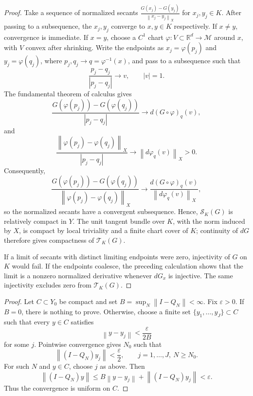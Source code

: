 \documentclass[11pt,oneside]{amsart}
\theoremstyle{plain}
\newtheorem{lemma}[theorem]{Lemma}
\theoremstyle{definition}
\theoremstyle{remark}
\newcommand{\RR}{\mathbb{R}}
\newcommand{\norm}[1]{\left\lVert #1\right\rVert}
\newcommand{\calL}{\mathcal{L}}
\newcommand{\calM}{\mathcal{M}}
\newcommand{\calT}{\mathcal{T}}
\begin{document}
\begin{proof}
Take a sequence of normalized secants $\frac{G(x_j)-G(y_j)}{\norm{x_j-y_j}_X}$ for $x_j,y_j\in K$. After passing to a subsequence, the $x_j,y_j$ converge to $x,y\in K$ respectively. If $x\neq y$, convergence is immediate. If $x=y$, choose a $C^1$ chart $\varphi:V\subset\RR^d\to\calM$ around $x$, with $V$ convex after shrinking. Write the endpoints as $x_j=\varphi(p_j)$ and $y_j=\varphi(q_j)$, where $p_j,q_j\to q=\varphi^{-1}(x)$, and pass to a subsequence such that
\[
    \frac{p_j-q_j}{|p_j-q_j|}\longrightarrow v,\qquad |v|=1.
\]
The fundamental theorem of calculus gives
\[
    \frac{G(\varphi(p_j))-G(\varphi(q_j))}{|p_j-q_j|}
    \longrightarrow d(G\circ\varphi)_{q}(v),
\]
and
\[
    \frac{\norm{\varphi(p_j)-\varphi(q_j)}_X}{|p_j-q_j|}
    \longrightarrow \norm{d\varphi_q(v)}_X>0.
\]
Consequently,
\[
    \frac{G(\varphi(p_j))-G(\varphi(q_j))}
         {\norm{\varphi(p_j)-\varphi(q_j)}_X}
    \longrightarrow
    \frac{d(G\circ\varphi)_q(v)}{\norm{d\varphi_q(v)}_X},
\]
so the normalized secants have a convergent subsequence. Hence, $\mathcal S_K(G)$ is relatively compact in $Y$. The unit tangent bundle over $K$, with the norm induced by $X$, is compact by local triviality and a finite chart cover of $K$; continuity of $dG$ therefore gives compactness of $\calT_K(G)$.

If a limit of secants with distinct limiting endpoints were zero, injectivity of $G$ on $K$ would fail. If the endpoints coalesce, the preceding calculation shows that the limit is a nonzero normalized derivative whenever $dG_x$ is injective. The same injectivity excludes zero from $\calT_K(G)$.
\end{proof}


\begin{proof}
Let $C\subset Y_0$ be compact and set $B=\sup_N\norm{I-Q_N}<\infty$. Fix $\varepsilon>0$. If $B=0$, there is nothing to prove. Otherwise, choose a finite set $\{y_1,\ldots,y_J\}\subset C$ such that every $y\in C$ satisfies
\[
    \norm{y-y_j}<\frac{\varepsilon}{2B}
\]
for some $j$. Pointwise convergence gives $N_0$ such that
\[
    \norm{(I-Q_N)y_j}<\frac{\varepsilon}{2},
    \qquad j=1,\ldots,J,\ N\geq N_0.
\]
For such $N$ and $y\in C$, choose $j$ as above. Then
\[
    \norm{(I-Q_N)y}
    \leq B\norm{y-y_j}+\norm{(I-Q_N)y_j}
    <\varepsilon.
\]
Thus the convergence is uniform on $C$.
\end{proof}
\end{document}
